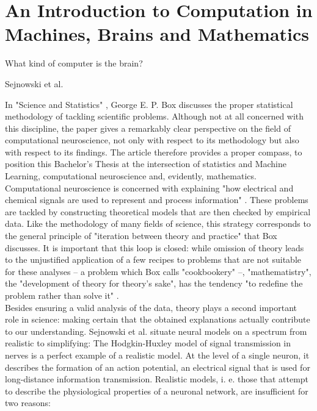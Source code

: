 \documentclass[a4paper,11pt]{report}
\begin{document}

\tableofcontents


\chapter{An Introduction to Computation in Machines, Brains and Mathematics}\label{ch:intro}
\setcounter{page}{1}

\epigraph{What kind of computer is the brain?}{Sejnowski et al. \cite[][1300]{Sejnowski1988}}

In "Science and Statistics" \cite{Box1976}, George E. P. Box discusses the proper statistical methodology of tackling scientific problems. Although not at all concerned with this discipline, the paper gives a remarkably clear perspective on the field of computational neuroscience, not only with respect to its methodology but also with respect to its findings. The article therefore provides a proper compass, to position this Bachelor's Thesis at the intersection of statistics and Machine Learning, computational neuroscience and, evidently, mathematics.\\
Computational neuroscience is concerned with explaining "how electrical and chemical signals are used to represent and process information" \cite[][1299]{Sejnowski1988}. These problems are tackled by constructing theoretical models that are then checked by empirical data. Like the methodology of many fields of science, this strategy corresponds to the general principle of "iteration between theory and practice" \cite[][791]{Box1976} that Box discusses. It is important that this loop is closed: while omission of theory leads to the unjustified application of a few recipes to problems that are not suitable for these analyses -- a problem which Box calls "cookbookery" \cite[][797]{Box1976} --, "mathematistry", the "development of theory for theory's sake", has the tendency "to redefine the problem rather than solve it" \cite[][797]{Box1976}.\\
Besides ensuring a valid analysis of the data, theory plays a second important role in science: making certain that the obtained explanations actually contribute to our understanding. Sejnowski et al. \cite{Sejnowski1988} situate neural models on a spectrum from realistic to simplifying:
The Hodgkin-Huxley model of signal transmission \cite{Hodgkin1952} in nerves is a perfect example of a realistic model. At the level of a single neuron, it describes the formation of an action potential, an electrical signal that is used for long-distance information transmission. Realistic models, i. e. those that attempt to describe the physiological properties of a neuronal network, are insufficient for two reasons:\\
\end{document}
